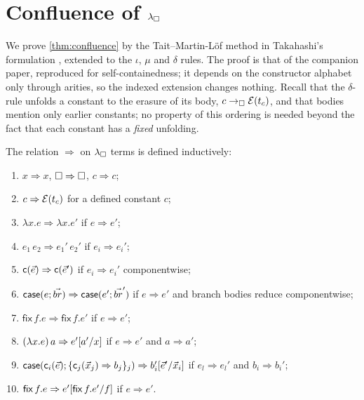 \section{Confluence of \texorpdfstring{$\lambda_{\square}$}{lambda-box}}
\label{sec:confluence}

We prove \cref{thm:confluence} by the Tait--Martin-L{\"o}f method in
Takahashi's formulation \cite{Takahashi1995}, extended to the $\iota$,
$\mu$ and $\delta$ rules.  The proof is that of the companion paper,
reproduced for self-containedness; it depends on the constructor
alphabet only through arities, so the indexed extension changes
nothing.  Recall that the $\delta$-rule unfolds a constant to the
erasure of its body, $c \rightarrow_{\square} \mathcal{E}(t_c)$, and that bodies mention only
earlier constants; no property of this ordering is needed beyond the
fact that each constant has a \emph{fixed} unfolding.

\begin{definition}
\label{def:parred}
The relation $\Rightarrow$ on $\lambda_{\square}$ terms is defined inductively:
\begin{enumerate}[leftmargin=2em,itemsep=0.2ex]
\item $x \Rightarrow x$, \quad $\square \Rightarrow \square$, \quad $c
  \Rightarrow c$;
\item $c \Rightarrow \mathcal{E}(t_c)$ for a defined constant $c$;
\item $\lambda x.e \Rightarrow \lambda x.e'$ if $e \Rightarrow e'$;
\item $e_1\,e_2 \Rightarrow e_1'\,e_2'$ if $e_i \Rightarrow e_i'$;
\item $\mathsf{c}(\vec{e}) \Rightarrow \mathsf{c}(\vec{e}')$ if $e_i
  \Rightarrow e_i'$ componentwise;
\item $\mathsf{case}(e; \vec{br}) \Rightarrow \mathsf{case}(e';
  \vec{br}')$ if $e \Rightarrow e'$ and branch bodies reduce
  componentwise;
\item $\mathsf{fix}\,f.e \Rightarrow \mathsf{fix}\,f.e'$ if $e
  \Rightarrow e'$;
\item $(\lambda x.e)\,a \Rightarrow e'[a'/x]$ if $e \Rightarrow
  e'$ and $a \Rightarrow a'$;
\item $\mathsf{case}(\mathsf{c}_i(\vec{e}); \{\mathsf{c}_j(\vec{x}_j)
  \Rightarrow b_j\}_j) \Rightarrow b_i'[\vec{e}'/\vec{x}_i]$ if
  $e_l \Rightarrow e_l'$ and $b_i \Rightarrow b_i'$;
\item $\mathsf{fix}\,f.e \Rightarrow
  e'[\mathsf{fix}\,f.e'/f]$ if $e \Rightarrow e'$.
\end{enumerate}
\end{definition}

